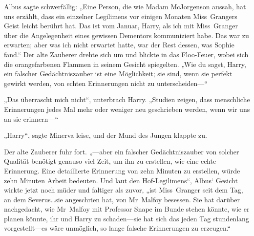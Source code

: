 Albus sagte schwerfällig: „Eine Person, die wie Madam McJorgenson aussah, hat uns erzählt, dass ein einzelner Legilimens vor einigen Monaten Miss~Grangers Geist leicht berührt hat. Das ist vom Januar, Harry, als ich mit Miss~Granger über die Angelegenheit eines gewissen Dementors kommuniziert habe. Das war zu erwarten; aber was ich nicht erwartet hatte, war der Rest dessen, was Sophie fand.“
Der alte Zauberer drehte sich um und blickte in das Floo-Feuer, wobei sich die orangefarbenen Flammen in seinem Gesicht spiegelten. „Wie du sagst, Harry, ein falscher Gedächtniszauber ist eine Möglichkeit; sie sind, wenn sie perfekt gewirkt werden, von echten Erinnerungen nicht zu unterscheiden—“

„Das überrascht mich nicht“, unterbrach Harry. „Studien zeigen, dass menschliche Erinnerungen jedes Mal mehr oder weniger neu geschrieben werden, wenn wir uns an sie erinnern—“

„Harry“, sagte Minerva leise, und der Mund des Jungen klappte zu.

Der alte Zauberer fuhr fort. „—aber ein falscher Gedächtniszauber von solcher Qualität benötigt genauso viel Zeit, um ihn zu erstellen, wie eine echte Erinnerung. Eine detaillierte Erinnerung von zehn Minuten zu erstellen, würde zehn Minuten Arbeit bedeuten. Und laut den Hof-Legilimens“, Albus‘ Gesicht wirkte jetzt noch müder und faltiger als zuvor, „ist Miss~Granger seit dem Tag, an dem Severus…sie angeschrien hat, von Mr~Malfoy besessen. Sie hat darüber nachgedacht, wie Mr~Malfoy mit Professor Snape im Bunde stehen könnte, wie er planen könnte, ihr und Harry zu schaden—sie hat sich das jeden Tag stundenlang vorgestellt—es wäre unmöglich, so lange falsche Erinnerungen zu erzeugen.“

